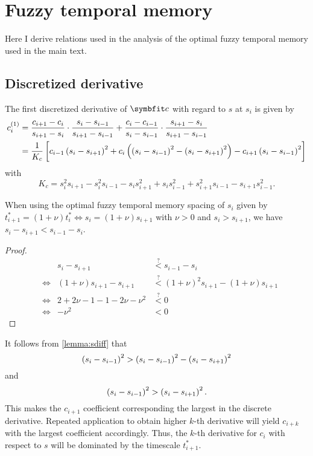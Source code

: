 \chapter{Fuzzy temporal memory}
Here I derive relations used in the analysis of the optimal fuzzy temporal memory \parencite{shankar2013} used in the main  text.

\section{Discretized derivative}\label{apdx:fuzzymem-derivative}
The first discretized derivative of $\vc c$ with regard to $s$ at $s_i$ is given by \parencite{shankar2013}
\begin{align}
    c_i^{(1)} &= \frac{c_{i+1} - c_i}{s_{i+1} - s_i} \cdot \frac{s_i - s_{i-1}}{s_{i+1} - s_{i-1}} + \frac{c_i - c_{i-1}}{s_i - s_{i-1}} \cdot \frac{s_{i+1} - s_i}{s_{i+1} - s_{i-1}} \\
    &= \frac{1}{K_c} \sbr{c_{i-1} \del{s_i - s_{i+1}}^2 + c_i \del{\del{s_i - s_{i-1}}^2 - \del{s_i - s_{i+1}}^2} - c_{i+1} \del{s_i - s_{i-1}}^2 }
\end{align}
with
\begin{equation*}
    K_c = s_i^2 s_{i+1} - s_i^2 s_{i-1} - s_i s_{i+1}^2 + s_i s_{i-1}^2 + s_{i+1}^2 s_{i-1} - s_{i+1} s_{i-1}^2 \text{.}
\end{equation*}
\begin{lemma}\label{lemma:sdiff}
    When using the optimal fuzzy temporal memory spacing of $s_i$ given by $t^*_{i+1} = (1 + \nu) t^*_i \Leftrightarrow s_i = (1 + \nu) s_{i+1}$ with $\nu > 0$ and $s_i > s_{i+1}$, we have $s_i - s_{i+1} < s_{i-1} - s_i$.
    \begin{proof}
        \begin{align*}
            && s_i - s_{i+1} &\stackrel{?}{<} s_{i-1} - s_i \\
            &\Leftrightarrow& (1+\nu) s_{i+1} - s_{i+1} &\stackrel{?}{<} {(1+\nu)}^2 s_{i+1} - (1+\nu) s_{i+1} \\
            &\Leftrightarrow& 2 + 2\nu - 1 - 1 - 2\nu - \nu^2 &\stackrel{?}{<} 0 \\
            &\Leftrightarrow& -\nu^2 &< 0
        \end{align*}
    \end{proof}
\end{lemma}
\noindent It follows from \cref{lemma:sdiff} that
\begin{equation}
    \del{s_i - s_{i-1}}^2 > \del{s_i - s_{i-1}}^2 - \del{s_i - s_{i+1}}^2
\end{equation}
and
\begin{equation}
    \del{s_i - s_{i-1}}^2 > \del{s_i - s_{i+1}}^2 \text{.}
\end{equation}
This makes the $c_{i+1}$ coefficient corresponding the largest in the discrete derivative.
Repeated application to obtain higher $k$-th derivative will yield $c_{i+k}$ with the largest coefficient accordingly.
Thus, the $k$-th derivative for $c_i$ with respect to $s$ will be dominated by the timescale $t^*_{i+1}$.


